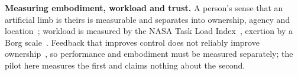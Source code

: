 \textbf{Measuring embodiment, workload and trust.} A person's sense that an
artificial limb is theirs is measurable and separates into ownership,
agency and location~\cite{botvinick1998rubber,longo2008embodiment};
workload is measured by the NASA Task Load Index~\cite{hart1988nasatlx},
exertion by a Borg scale~\cite{borg1982perceived}. Feedback that improves
control does not reliably improve ownership~\cite{pinardi2023feedback}, so
performance and embodiment must be measured separately; the pilot here
measures the first and claims nothing about the second.
